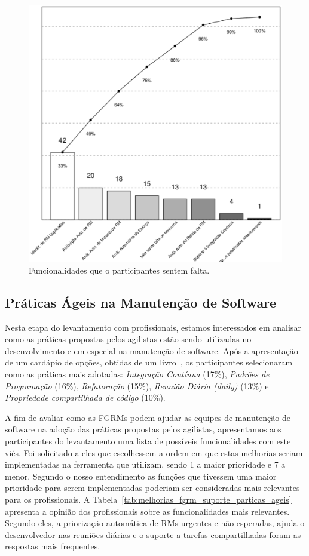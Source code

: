 \begin{figure}[htpb]
	\centering
	\includegraphics[width=0.9\linewidth]{./chapter-pesquisa-com-profissionais/img/grafico_melhorias_fgrm_funcionalidades_faltantes.eps}
	\caption{Funcionalidades que o participantes sentem falta.}\label{fig:grafico_melhorias_fgrm_funcionalidades_falantes}
\end{figure}

\subsection{Práticas Ágeis na Manutenção de Software}\label{sub:práticas_ágeis_na_manutenção_de_software}

Nesta etapa do levantamento com profissionais, estamos interessados em analisar
como as práticas propostas pelos agilistas estão sendo utilizadas no
desenvolvimento e em especial na manutenção de software. Após a apresentação de
um cardápio de opções, obtidas de um livro~\cite{meyer2014agile}, os
participantes selecionaram como as práticas mais adotadas: \textit{Integração
    Contínua} (17\%), \textit{Padrões de Programação} (16\%),
\textit{Refatoração} (15\%), \textit{Reunião Diária (daily)} (13\%) e
\textit{Propriedade compartilhada de código} (10\%).

A fim de avaliar como as FGRMs podem ajudar as equipes de manutenção de
software na adoção das práticas propostas pelos agilistas, apresentamos aos
participantes do levantamento uma lista de possíveis funcionalidades com este
viés. Foi solicitado a eles que escolhessem a ordem em que estas melhorias
seriam implementadas na ferramenta que utilizam, sendo 1 a maior prioridade e 7
a menor. Segundo o nosso entendimento as funções que tivessem uma maior
prioridade para serem implementadas poderiam ser consideradas mais relevantes
para os profissionais. A Tabela~\ref{tab:melhorias_fgrm_suporte_particas_ageis}
apresenta a opinião dos profissionais sobre as funcionalidades mais relevantes.
Segundo eles, a priorização automática de RMs urgentes e não esperadas, ajuda o
desenvolvedor nas reuniões diárias e o suporte a tarefas compartilhadas foram
as respostas mais frequentes.

